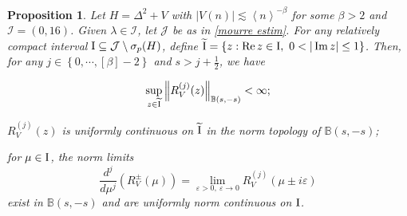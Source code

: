 \documentclass[reqno, 11pt]{amsart}
\newtheorem{proposition}[definition]{Proposition}
\newcommand\B{\mathbb{B}}
\newcommand\mcaI{\mathcal{I}}
\newcommand\mcaJ{\mathcal{J}}
\numberwithin{equation}{section}
\begin{document}
\begin{proposition}\label{LAP1}
 Let $H=\Delta^2+V$ with $|V(n)|\lesssim \left<n\right>^{-\beta}$ for some $\beta>2$ and $\mcaI=(0,16)$. Given $\lambda\in \mcaI$, let $\mcaJ$ be as in \eqref{mourre estim}. For any relatively compact interval ${\rm I}\subseteq\mcaJ\setminus\sigma_{p}(H)$, define $\widetilde{\rm I}=\{z:\operatorname{Re} z\in {\rm I},\ 0<|\operatorname{Im} z|\leq1\}$. Then, for any $j\in\left\{0,\cdots,[\beta]-2\right\}$ and $s>j+\frac{1}{2}$, we have
\begin{itemize}
{
\item [{\rm (i)}] \begin{equation}\label{jth reso estim}
\sup\limits_{z\in\widetilde{\rm I}}\left\|R^{(j)}_V(z)\right\|_{\B(s,-s)}<\infty;
    \end{equation}
\item[{\rm (ii)}] $R^{(j)}_V(z)$ is uniformly continuous on $\widetilde{\rm I}$ in the norm topology of $\B(s,-s)$;
\vskip0.1cm
\item[{\rm (iii)}] for $\mu\in {\rm I}$, the norm limits
\begin{equation*}
     \frac{d^{j}}{d\mu^j}(R^{\pm}_V(\mu))=\lim\limits_{\varepsilon>0,\ \varepsilon\rightarrow0}R^{(j)}_V(\mu\pm i\varepsilon)
    \end{equation*}
     exist in $\B(s,-s)$ and are uniformly norm continuous on ${\rm I}$.
}
\end{itemize}
\end{proposition}
\end{document}
